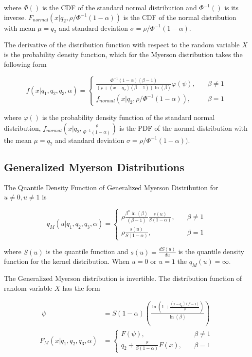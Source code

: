 \documentclass[
]{interact}
\begin{document}
where \(\Phi()\) is the CDF of the standard normal distribution and
\(\Phi^{-1}()\) is its inverse.
\(F_{normal}(x\vert q_2,\rho/\Phi^{-1}(1-\alpha))\) is the CDF of the
normal distribution with mean \(\mu=q_2\) and standard deviation
\(\sigma=\rho/\Phi^{-1}(1-\alpha)\).

The derivative of the distribution function with respect to the random
variable \(X\) is the probability density function, which for the
Myerson distribution takes the following form

\[
f(x\vert q_1, q_2, q_3, \alpha)=\begin{cases}
\frac{\Phi^{-1}(1-\alpha)(\beta-1)}{(\rho+(x-q_2)(\beta-1))\ln(\beta)}\varphi(\psi), \quad &\beta\neq1\\
f_{normal}(x\vert q_2,\rho/\Phi^{-1}(1-\alpha)),\quad &\beta=1
\end{cases}
\]

where \(\varphi()\) is the probability density function of the standard
normal distribution,
\(f_{normal}(x\vert q_2,\frac{\rho}{\Phi^{-1}(1-\alpha)})\) is the PDF
of the normal distribution with the mean \(\mu=q_2\) and standard
deviation \(\sigma=\rho/\Phi^{-1}(1-\alpha))\).

\subsection*{Generalized Myerson
Distributions}\label{generalized-myerson-distributions-1}

The Quantile Density Function of Generalized Myerson Distribution for
\(u\neq0, u\neq1\) is

\[
q_M(u\vert q_1,q_2,q_3,\alpha)=\begin{cases}
\rho\frac{\beta^\kappa\ln(\beta)}{(\beta-1)}\frac{s(u)}{S(1-\alpha)}, \quad &\beta \neq 1\\
\rho\frac{s(u)}{S(1-\alpha)}, \quad &\beta = 1
\end{cases}
\]

where \(S(u)\) is the quantile function and \(s(u)=\frac{dS(u)}{du}\) is
the quantile density function for the kernel distribution. When \(u=0\)
or \(u=1\) the \(q_M(u)=\infty\).

The Generalized Myerson distribution is invertible. The distribution
function of random variable \(X\) has the form

\[
\begin{aligned}\;
\psi &=S(1-\alpha)\left(\frac{\ln\left(1+\frac{(x-q_2)(\beta-1)}{\rho}\right)}{\ln(\beta)}\right)\\
F_M(x\vert q_1, q_2, q_3, \alpha)&=\begin{cases}
F(\psi), \quad &\beta\neq 1\\
q_2+ \frac{\rho}{S(1-\alpha)}F(x), \quad &\beta=1
\end{cases}
\end{aligned}
\]
\end{document}
